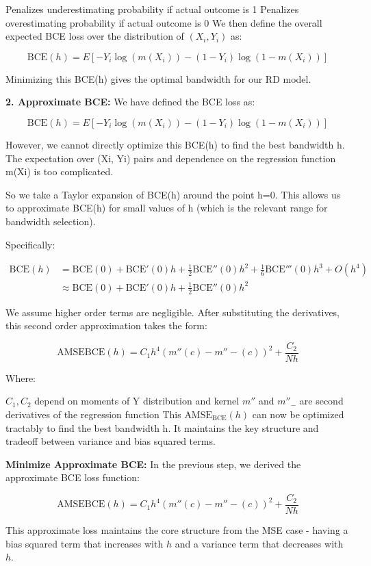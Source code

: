  

Penalizes underestimating probability if actual outcome is 1
Penalizes overestimating probability if actual outcome is 0
We then define the overall expected BCE loss over the distribution of $(X_i, Y_i)$ as:

$$\text{BCE}(h) = E[-Y_i \log(m(X_i)) - (1-Y_i)\log(1-m(X_i))]$$

Minimizing this BCE(h) gives the optimal bandwidth for our RD model.



\textbf{ 2. Approximate BCE:}
We have defined the BCE loss as:

$$\text{BCE}(h) = E[-Y_i \log(m(X_i)) - (1-Y_i)\log(1-m(X_i))]$$

However, we cannot directly optimize this BCE(h) to find the best bandwidth h. The expectation over (Xi, Yi) pairs and dependence on the regression function m(Xi) is too complicated.

So we take a Taylor expansion of BCE(h) around the point h=0. This allows us to approximate BCE(h) for small values of h (which is the relevant range for bandwidth selection).

Specifically:

\begin{align*}
\text{BCE}(h) &= \text{BCE}(0) + \text{BCE}'(0)h + \frac{1}{2}\text{BCE}''(0)h^2 + \frac{1}{6}\text{BCE}'''(0)h^3 + O(h^4)\\
&\approx \text{BCE}(0) + \text{BCE}'(0)h + \frac{1}{2}\text{BCE}''(0)h^2
\end{align*}

We assume higher order terms are negligible. After substituting the derivatives, this second order approximation takes the form:

$$\text{AMSE}\text{BCE}(h) = C_1h^4(m''(c)-m''-(c))^2 + \frac{C_2}{Nh}$$

Where:

$C_1, C_2$ depend on moments of Y distribution and kernel
$m''$ and $m''_-$ are second derivatives of the regression function
This $\text{AMSE}_\text{BCE}(h)$ can now be optimized tractably to find the best bandwidth h. It maintains the key structure and tradeoff between variance and bias squared terms.

\textbf{Minimize Approximate BCE:}
In the previous step, we derived the approximate BCE loss function:

$$\text{AMSE}\text{BCE}(h) = C_1h^4(m''(c)-m''-(c))^2 + \frac{C_2}{Nh}$$

This approximate loss maintains the core structure from the MSE case - having a bias squared term that increases with $h$ and a variance term that decreases with $h$.


